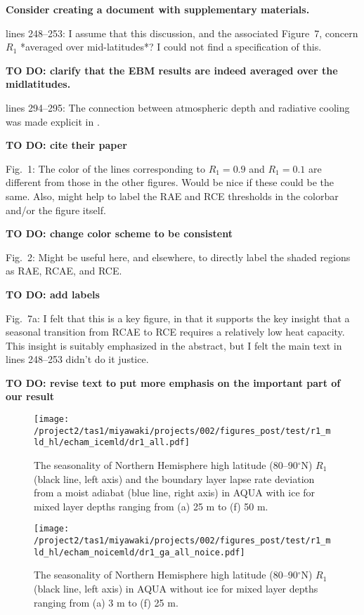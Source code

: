 \documentclass{article}
\begin{document}
{\color{red}\textbf{Consider creating a document with supplementary materials.}}

lines 248--253: I assume that this discussion, and the associated Figure~7, concern $R_1$ *averaged over mid-latitudes*? I could not find a specification of this.

{\color{red}\textbf{TO DO: clarify that the EBM results are indeed averaged over the midlatitudes.}}

lines 294--295: The connection between atmospheric depth and radiative cooling was made explicit in \cite{jeevanjee2018}.

{\color{red}\textbf{TO DO: cite their paper}}

Fig.~1: The color of the lines corresponding to $R_1=0.9$ and $R_1=0.1$ are different from those in the other figures. Would be nice if these could be the same. Also, might help to label the RAE and RCE thresholds in the colorbar and/or the figure itself.

{\color{red}\textbf{TO DO: change color scheme to be consistent}}

Fig.~2: Might be useful here, and elsewhere, to directly label the shaded regions as RAE, RCAE, and RCE.

{\color{red}\textbf{TO DO: add labels}}

Fig.~7a: I felt that this is a key figure, in that it supports the key insight that a seasonal transition from RCAE to RCE requires a relatively low heat capacity. This insight is suitably emphasized in the abstract, but I felt the main text in lines 248--253 didn't do it justice.

{\color{red}\textbf{TO DO: revise text to put more emphasis on the important part of our result}}

\begin{figure}[t]
  \noindent\texttt{[image: /project2/tas1/miyawaki/projects/002/figures\_post/test/r1\_mld\_hl/echam\_icemld/dr1\_all.pdf]}
  \caption{The seasonality of Northern Hemisphere high latitude (80--90$^\circ$N) $R_1$ (black line, left axis) and the boundary layer lapse rate deviation from a moist adiabat (blue line, right axis) in AQUA with ice for mixed layer depths ranging from (a) 25 m to (f) 50 m.}
  \label{fig:r1-hl-mld}
\end{figure}

\begin{figure}[t]
  \noindent\texttt{[image: /project2/tas1/miyawaki/projects/002/figures\_post/test/r1\_mld\_hl/echam\_noicemld/dr1\_ga\_all\_noice.pdf]}
  \caption{The seasonality of Northern Hemisphere high latitude (80--90$^\circ$N) $R_1$ (black line, left axis) in AQUA without ice for mixed layer depths ranging from (a) 3 m to (f) 25 m.}
  \label{fig:r1-hl-mld-noice}
\end{figure}




\end{document}

